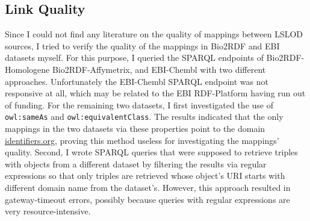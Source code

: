 \documentclass[runningheads]{llncs}
\begin{document}
    \subsection{Link Quality}
    Since I could not find any literature on the quality of mappings between LSLOD sources, I tried to verify the quality of the mappings in Bio2RDF and EBI datasets myself.
    For this purpose, I queried the SPARQL endpoints of Bio2RDF-Homologene Bio2RDF-Affymetrix, and EBI-Chembl with two different approaches.
    Unfortunately the EBI-Chembl SPARQL endpoint was not responsive at all, which may be related to the EBI RDF-Platform having run out of funding.
    For the remaining two datasets, I first investigated the use of \texttt{owl:sameAs} and \texttt{owl:equivalentClass}.
    The results indicated that the only mappings in the two datasets via these properties point to the domain \url{identifiers.org}, proving this method useless for investigating the mappings' quality.
    Second, I wrote SPARQL queries that were supposed to retrieve triples with objects from a different dataset by filtering the results via regular expressions so that only triples are retrieved whose object's URI starts with different domain name from the dataset's.
    However, this approach resulted in gateway-timeout errors, possibly because queries with regular expressions are very resource-intensive.

%
%
%
    
    
%
\end{document}
